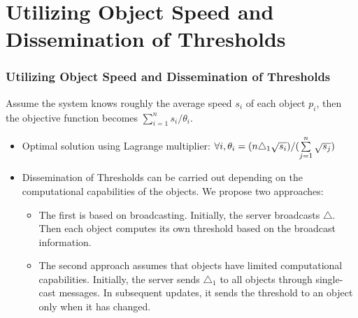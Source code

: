 \documentclass{beamer}
\begin{document}
\section{Utilizing Object Speed and Dissemination of Thresholds}
\begin{frame}
  \frametitle{Utilizing Object Speed and Dissemination of Thresholds}
  Assume the system knows roughly the average speed $s_{i}$ of each object $p_{i}$, then the objective function becomes $\sum\limits_{i=1}^n s_i/\theta_i$.
  \begin{itemize}
    \item Optimal solution using Lagrange multiplier: $\forall i,\space \theta_{i} = (n\triangle_{1} \sqrt{s_{i}})/(\sum\limits_{j=1}^n \sqrt{s_{j}})$
    \item Dissemination of Thresholds can be carried out depending on the computational capabilities of the objects. We propose two approaches:
          \begin{itemize}
            \item The first is
                  based on broadcasting. Initially, the
                  server broadcasts $\triangle$. Then each object
                  computes its own threshold based on the broadcast
                  information.
            \item The second approach assumes that objects have limited
                  computational capabilities. Initially, the server sends $\triangle_{1}$ to
                  all objects through single-cast messages. In subsequent
                  updates, it sends the threshold to an object only when it has
                  changed.
          \end{itemize}
  \end{itemize}


\end{frame}



\end{document}
